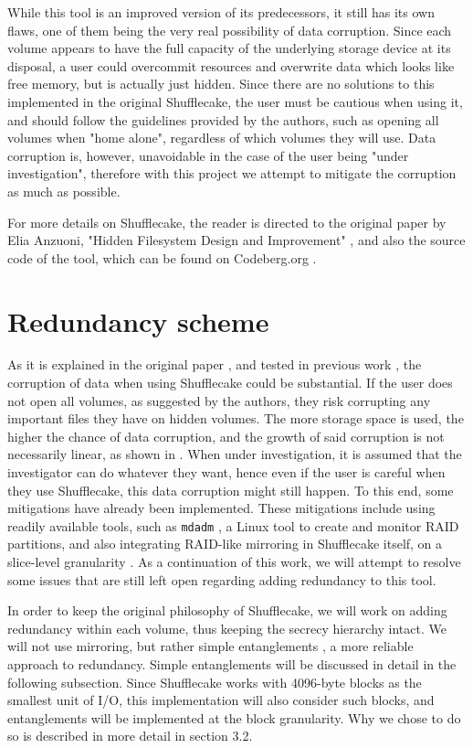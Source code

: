 \documentclass[a4paper,11pt,oneside]{report}
\begin{document}
While this tool is an improved version of its predecessors, it still has its own flaws, one of them being the very real possibility of data corruption. Since each volume appears to have the full capacity of the underlying storage device at its disposal, a user could overcommit resources and overwrite data which looks like free memory, but is actually just hidden. Since there are no solutions to this implemented in the original Shufflecake, the user must be cautious when using it, and should follow the guidelines provided by the authors, such as opening all volumes when "home alone", regardless of which volumes they will use. Data corruption is, however, unavoidable in the case of the user being "under investigation", therefore with this project we attempt to mitigate the corruption as much as possible. 

For more details on Shufflecake, the reader is directed to the original paper by Elia Anzuoni, "Hidden Filesystem Design and Improvement" \cite{elia}, and also the source code of the tool, which can be found on Codeberg.org \cite{shufflecake-code}. 

\chapter{Redundancy scheme}

As it is explained in the original paper \cite{elia}, and tested in previous work \cite{kilian}, the corruption of data when using Shufflecake could be substantial. If the user does not open all volumes, as suggested by the authors, they risk corrupting any important files they have on hidden volumes. The more storage space is used, the higher the chance of data corruption, and the growth of said corruption is not necessarily linear, as shown in \cite{kilian}. When under investigation, it is assumed that the investigator can do whatever they want, hence even if the user is careful when they use Shufflecake, this data corruption might still happen. To this end, some mitigations have already been implemented. These mitigations include using readily available tools, such as \texttt{mdadm} \cite{mdadm_man}, a Linux tool to create and monitor RAID partitions, and also integrating RAID-like mirroring in Shufflecake itself, on a slice-level granularity \cite{kilian}. As a continuation of this work, we will attempt to resolve some issues that are still left open regarding adding redundancy to this tool. 

In order to keep the original philosophy of Shufflecake, we will work on adding redundancy within each volume, thus keeping the secrecy hierarchy intact. We will not use mirroring, but rather simple entanglements \cite{estrada}, a more reliable approach to redundancy. Simple entanglements will be discussed in detail in the following subsection. Since Shufflecake works with 4096-byte blocks as the smallest unit of I/O, this implementation will also consider such blocks, and entanglements will be implemented at the block granularity. Why we chose to do so is described in more detail in section 3.2. 
\end{document}
